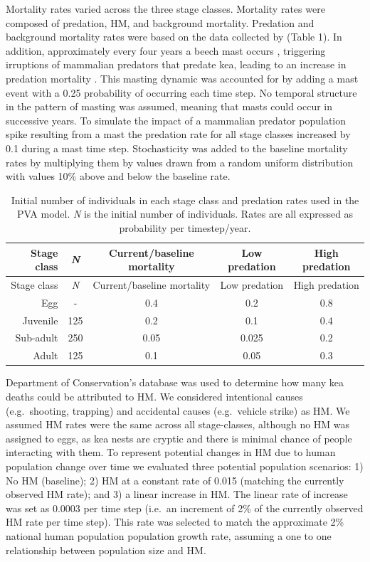 \documentclass[11pt,]{article}
\begin{document}
Mortality rates varied across the three stage classes. Mortality rates
were composed of predation, HM, and background mortality. Predation and
background mortality rates were based on the data collected by
\citet{seal1991} (Table 1). In addition, approximately every four years
a beech mast occurs \citep{ogden1996}, triggering irruptions of
mammalian predators that predate kea, leading to an increase in
predation mortality
\citep[\href{mailto:2001@elliott1996}{\nolinkurl{2001@elliott1996}};][]{choquenot2006}.
This masting dynamic was accounted for by adding a mast event with a
0.25 probability of occurring each time step. No temporal structure in
the pattern of masting was assumed, meaning that masts could occur in
successive years. To simulate the impact of a mammalian predator
population spike resulting from a mast the predation rate for all stage
classes increased by 0.1 during a mast time step. Stochasticity was
added to the baseline mortality rates by multiplying them by values
drawn from a random uniform distribution with values 10\% above and
below the baseline rate.

\begin{longtable}[]{@{}rcccc@{}}
\caption{Initial number of individuals in each stage class and predation
rates used in the PVA model. \emph{N} is the initial number of
individuals. Rates are all expressed as probability per
timestep/year.}\tabularnewline
\toprule
Stage class & \emph{N} & Current/baseline mortality & Low predation &
High predation\tabularnewline
\midrule
\endfirsthead
\toprule
Stage class & \emph{N} & Current/baseline mortality & Low predation &
High predation\tabularnewline
\midrule
\endhead
Egg & - & 0.4 & 0.2 & 0.8\tabularnewline
Juvenile & 125 & 0.2 & 0.1 & 0.4\tabularnewline
Sub-adult & 250 & 0.05 & 0.025 & 0.2\tabularnewline
Adult & 125 & 0.1 & 0.05 & 0.3\tabularnewline
\bottomrule
\end{longtable}

Department of Conservation's database was used to determine how many kea
deaths could be attributed to HM. We considered intentional causes
(e.g.~shooting, trapping) and accidental causes (e.g.~vehicle strike) as
HM. We assumed HM rates were the same across all stage-classes, although
no HM was assigned to eggs, as kea nests are cryptic and there is
minimal chance of people interacting with them. To represent potential
changes in HM due to human population change over time we evaluated
three potential population scenarios: 1) No HM (baseline); 2) HM at a
constant rate of 0.015 (matching the currently observed HM rate); and 3)
a linear increase in HM. The linear rate of increase was set as 0.0003
per time step (i.e.~an increment of 2\% of the currently observed HM
rate per time step). This rate was selected to match the approximate 2\%
national human population population growth rate, assuming a one to one
relationship between population size and HM.
\end{document}
